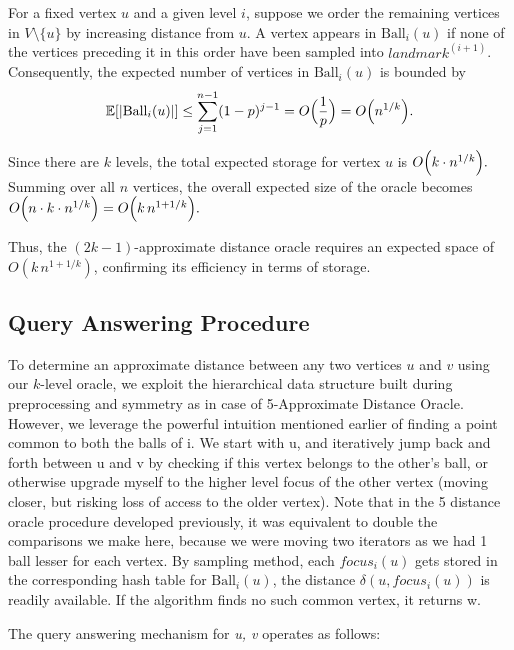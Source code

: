 \documentclass{article}
\begin{document}
For a fixed vertex \(u\) and a given level \(i\), suppose we order the remaining vertices in \(V \setminus \{u\}\) by increasing distance from \(u\). A vertex appears in \(\text{Ball}_i(u)\) if none of the vertices preceding it in this order have been sampled into \(landmark^{(i+1)}\). Consequently, the expected number of vertices in \(\text{Ball}_i(u)\) is bounded by
\[
\mathbb{E}[|\text{Ball}_i(u)|] \le \sum_{j=1}^{n-1}(1-p)^{j-1} = O\Bigl(\frac{1}{p}\Bigr) = O\Bigl(n^{1/k}\Bigr).
\]

Since there are \(k\) levels, the total expected storage for vertex \(u\) is
\(
O\Bigl(k \cdot n^{1/k}\Bigr).
\)\\
Summing over all \(n\) vertices, the overall expected size of the oracle becomes
\(
O\Bigl(n \cdot k \cdot n^{1/k}\Bigr) = O\Bigl(k\, n^{1+1/k}\Bigr).
\)

Thus, the \((2k-1)\)-approximate distance oracle requires an expected space of \(O(k\, n^{1+1/k})\), confirming its efficiency in terms of storage.

\subsection{Query Answering Procedure}

To determine an approximate distance between any two vertices \(u\) and \(v\) using our \(k\)-level oracle, we exploit the hierarchical data structure built during preprocessing and symmetry as in case of 5-Approximate Distance Oracle. However, we leverage the powerful intuition mentioned earlier of finding a point common to both the balls of i. We start with u, and iteratively jump back and forth between u and v by checking if this vertex belongs to the other's ball, or otherwise upgrade myself to the higher level focus of the other vertex (moving closer, but risking loss of access to the older vertex). Note that in the 5 distance oracle procedure developed previously, it was equivalent to double the comparisons we make here, because we were moving two iterators as we had 1 ball lesser for each vertex. By sampling method, each \(focus_i(u)\) gets stored in the corresponding hash table for \(\text{Ball}_i(u)\), the distance \(\delta(u,focus_i(u))\) is readily available. If the algorithm finds no such common vertex, it returns w.

The query answering mechanism for \textit{u, v} operates as follows:
\end{document}
